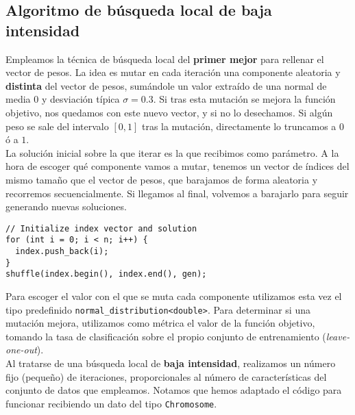 \documentclass[12pt]{article}
\begin{document}
\subsection*{Algoritmo de búsqueda local de baja intensidad}
\label{bl}

Empleamos la técnica de búsqueda local del \textbf{primer mejor} para rellenar el vector de pesos. La idea es mutar en cada iteración una componente aleatoria y \textbf{distinta} del vector de pesos, sumándole un valor extraído de una normal de media $0$ y desviación típica $\sigma = 0.3$. Si tras esta mutación se mejora la función objetivo, nos quedamos con este nuevo vector, y si no lo desechamos. Si algún peso se sale del intervalo $[0,1]$ tras la mutación, directamente lo truncamos a $0$ ó a $1$.\\

La solución inicial sobre la que iterar es la que recibimos como parámetro. A la hora de escoger qué componente vamos a mutar, tenemos un vector de índices del mismo tamaño que el vector de pesos, que barajamos de forma aleatoria y recorremos secuencialmente. Si llegamos al final, volvemos a barajarlo para seguir generando nuevas soluciones.

\begin{verbatim}
// Initialize index vector and solution
for (int i = 0; i < n; i++) {
  index.push_back(i);
}
shuffle(index.begin(), index.end(), gen);
\end{verbatim}

Para escoger el valor con el que se muta cada componente utilizamos esta vez el tipo predefinido \verb|normal_distribution<double>|. Para determinar si una mutación mejora, utilizamos como métrica el valor de la función objetivo, tomando la tasa de clasificación sobre el propio conjunto de entrenamiento (\textit{leave-one-out}).\\

Al tratarse de una búsqueda local de \textbf{baja intensidad}, realizamos un número fijo (pequeño) de iteraciones, proporcionales al número de características del conjunto de datos que empleamos. Notamos que hemos adaptado el código para funcionar recibiendo un dato del tipo \verb|Chromosome|.
\end{document}
